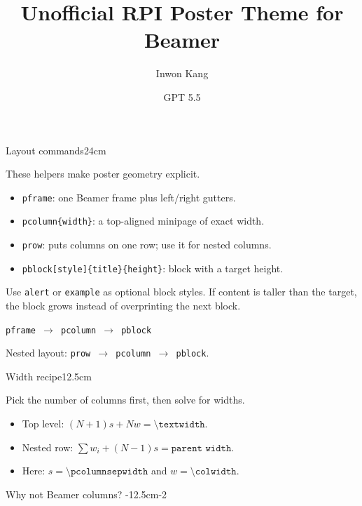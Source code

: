 \documentclass[final]{beamer}
\title{Unofficial RPI Poster Theme for Beamer}
\author{Inwon Kang \inst{1} \and GPT 5.5 \inst{2}}
\institute[shortinst]{\inst{1} Rensselaer Polytechnic Institute \samelineand \inst{2} OpenAI}
\newlength{\colwidth}
\begin{document}
\begin{pframe}

	\begin{pcolumn}{\colwidth}

		\begin{pblock}{Layout commands}{24cm}

			These helpers make poster geometry explicit.

			\begin{itemize}
				\item \texttt{pframe}: one Beamer frame plus left/right gutters.
				\item \texttt{pcolumn\{width\}}: a top-aligned minipage of exact width.
				\item \texttt{prow}: puts columns on one row; use it for nested columns.
				\item \texttt{pblock[style]\{title\}\{height\}}: block with a target height.
			\end{itemize}

			Use \texttt{alert} or \texttt{example} as optional block styles. If content is taller than the target, the block grows instead of overprinting the next block.

			\texttt{pframe $\rightarrow$ pcolumn $\rightarrow$ pblock}\par
			Nested layout: \texttt{prow $\rightarrow$ pcolumn $\rightarrow$ pblock}.

		\end{pblock}

		\begin{pblock}{Width recipe}{12.5cm}

			Pick the number of columns first, then solve for widths.

			\begin{itemize}
				\item Top level: $(N+1)s + Nw = \texttt{\textbackslash textwidth}$.
				\item Nested row: $\sum w_i + (N-1)s = \texttt{parent width}$.
				\item Here: $s=\texttt{\textbackslash pcolumnsepwidth}$ and $w=\texttt{\textbackslash colwidth}$.
			\end{itemize}

		\end{pblock}

		\begin{pblock}[alert]{Why not Beamer columns?}{%
				\textheight-24cm-12.5cm-2\blocksepheight
			}


\end{pblock}
\end{pcolumn}
\end{pframe}
\end{document}
